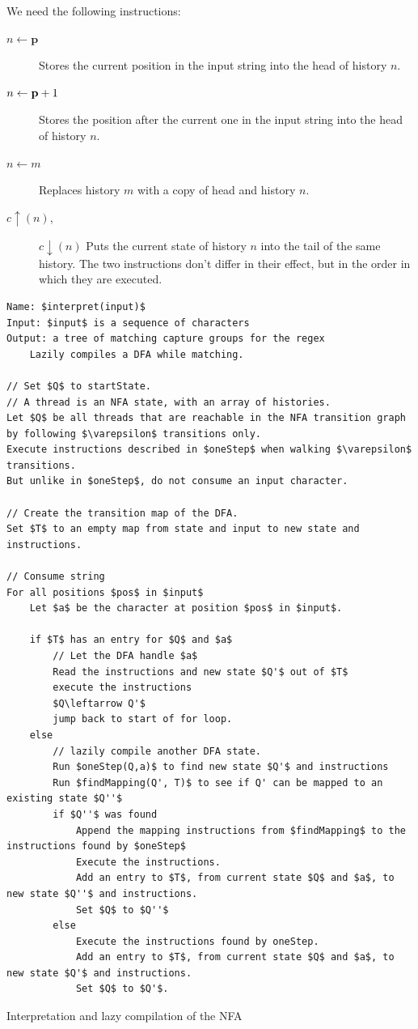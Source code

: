 \documentclass[english]{sigplanconf}
\theoremstyle{definition}
\begin{document}
We need the following instructions:
\begin{description}
\item [{$n\leftarrow\mathbf{p}$}] Stores the current position in the input
string into the head of history $n$.
\item [{$n\leftarrow\mathbf{\mathbf{p}}+1$}] Stores the position after the current one
in the input string into the head of history $n$.
\item [{$n\leftarrow m$}] Replaces history $m$ with a copy of
head and history $n$.
\item [{$c\uparrow(n)$,}] $c\downarrow(n)$ Puts the current state of
history $n$ into the tail of the same history. The
two instructions don't differ in their effect, but in the order in
which they are executed.
\end{description}
\begin{algorithm*}[tb]
\begin{lstlisting}[mathescape,tabsize=2]
Name: $interpret(input)$
Input: $input$ is a sequence of characters
Output: a tree of matching capture groups for the regex
	Lazily compiles a DFA while matching.

// Set $Q$ to startState.
// A thread is an NFA state, with an array of histories.
Let $Q$ be all threads that are reachable in the NFA transition graph by following $\varepsilon$ transitions only.
Execute instructions described in $oneStep$ when walking $\varepsilon$ transitions.
But unlike in $oneStep$, do not consume an input character.

// Create the transition map of the DFA.
Set $T$ to an empty map from state and input to new state and instructions.

// Consume string
For all positions $pos$ in $input$
	Let $a$ be the character at position $pos$ in $input$.
	
	if $T$ has an entry for $Q$ and $a$
		// Let the DFA handle $a$
		Read the instructions and new state $Q'$ out of $T$
		execute the instructions
		$Q\leftarrow Q'$
		jump back to start of for loop.
	else
		// lazily compile another DFA state.
		Run $oneStep(Q,a)$ to find new state $Q'$ and instructions 
		Run $findMapping(Q', T)$ to see if Q' can be mapped to an existing state $Q''$
		if $Q''$ was found
			Append the mapping instructions from $findMapping$ to the instructions found by $oneStep$
			Execute the instructions.
			Add an entry to $T$, from current state $Q$ and $a$, to new state $Q''$ and instructions.
			Set $Q$ to $Q''$
		else
			Execute the instructions found by oneStep.
			Add an entry to $T$, from current state $Q$ and $a$, to new state $Q'$ and instructions.
			Set $Q$ to $Q'$.
\end{lstlisting}
\caption{Interpretation and lazy compilation of the NFA}
\end{algorithm*}
\end{document}
